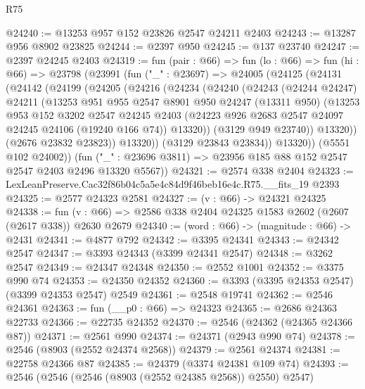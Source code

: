 \begin{lexlean}{R75}
\begin{coremodule}
@24240 := @13253 @957 @152 @23826 @2547 @24211 @2403
@24243 := @13287 @956 @8902 @23825
@24244 := @2397 @950
@24245 := @137 @23740
@24247 := @2397 @24245 @2403
@24319 := fun (pair : @66) =>
  fun (lo : @66) =>
  fun (hi : @66) =>
  @23798
    (@23991
      (fun ("_" : @23697) =>
      @24005
        (@24125
          (@24131
            (@24142
              (@24199
                (@24205
                  (@24216
                    (@24234
                      (@24240
                        (@24243
                          (@24244 @24247)
                          @24211
                          (@13253
                            @951
                            @955
                            @2547
                            @8901
                            @950
                            @24247
                            (@13311 @950)
                            (@13253
                              @953
                              @152
                              @3202
                              @2547
                              @24245
                              @2403
                              (@24223 @926 @2683 @2547 @24097 @24245 @24106 (@19240 @166 @74))
                              @13320))
                          (@3129 @949 @23740))
                        @13320))
                    (@2676 @23832 @23823))
                  @13320))
              (@3129 @23843 @23834))
            @13320))
        (@5551 @102 @24002))
      (fun ("_" : @23696 @3811) => @23956 @185 @88 @152 @2547 @2547 @2403 @2496 @13320 @5567))
@24321 := @2574 @338 @2404
@24323 := LexLeanPreserve.Cac32f86b04c5a5e4c84d9f46beb16e4c.R75.__fits_19 @2393
@24325 := @2577 @24323 @2581
@24327 := (v : @66) -> @24321 @24325
@24338 := fun (v : @66) => @2586 @338 @2404 @24325 @1583 @2602 (@2607 (@2617 @338)) @2630 @2679
@24340 := (word : @66) -> (magnitude : @66) -> @2431
@24341 := @4877 @792
@24342 := @3395 @24341
@24343 := @24342 @2547
@24347 := @3393 @24343 (@3399 @24341 @2547)
@24348 := @3262 @2547
@24349 := @24347 @24348
@24350 := @2552 @1001
@24352 := @3375 @990 @74
@24353 := @24350 @24352
@24360 := @3393 (@3395 @24353 @2547) (@3399 @24353 @2547) @2549
@24361 := @2548 @19741
@24362 := @2546 @24361
@24363 := fun (__p0 : @66) => @24323
@24365 := @2686 @24363 @22733
@24366 := @22735 @24352
@24370 := @2546 (@24362 (@24365 @24366 @87))
@24371 := @2561 @990
@24374 := @24371 (@2943 @990 @74)
@24378 := @2546 (@8903 (@2552 @24374 @2568))
@24379 := @2561 @24374
@24381 := @22758 @24366 @87
@24385 := @24379 (@3374 @24381 @109 @74)
@24393 := @2546 (@2546 (@2546 (@8903 (@2552 @24385 @2568)) @2550) @2547)

\end{coremodule}
\end{lexlean}
